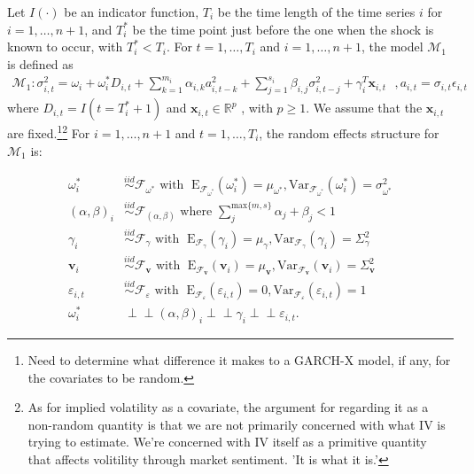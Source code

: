 \documentclass[11pt]{article}
\newcommand{\R}{\mathbb{R}}
\newcommand{\x}{\textbf{x}}
\def\mbf#1{\mathbf{#1}} %
\newcommand{\simiid}{\stackrel{iid}{\sim}} %
\newcommand{\indep}{\perp \!\!\! \perp } %
\def\mrm#1{\mathrm{#1}} %
\def\mc#1{\mathcal{#1}} %
\def\mc#1{\mathcal{#1}}
\theoremstyle{definition}
\begin{document}
Let $I(\cdot)$ be an indicator function, $T_i$ be the time length of the time series $i$ for $i = 1, \ldots, n+1$, and $T_i^*$ be the time point just before the one when the shock is known to occur, with $T_i^* < T_i$.  For $t= 1, \ldots, T_i$ and $i = 1, \ldots, n+1$, the model $\mc{M}_1$ is defined as
\begin{align}
\mc{M}_1 \colon \sigma^{2}_{i,t} = \omega_{i} + \omega^{*}_i D_{i,t}  + \sum^{m_{i}}_{k=1}\alpha_{i,k}a^{2}_{i,t-k} + \sum_{j=1}^{s_{i}}\beta_{i,j}\sigma_{i,t-j}^{2} + \gamma_{i}^{T} 
          \x_{i,t} \text{ }, a_{i,t} = \sigma_{i,t}\epsilon_{i,t} \label{equation1}
\end{align}
 where $D_{i,t} = I(t = T_i^* + 1)$ 
and $\x_{i,t} \in \R^{p}$ , with $p \geq 1$.  We assume that the 
$\mbf{x}_{i,t}$ are fixed.\footnote{Need to determine what difference it makes to a GARCH-X model, if any, for the covariates to be random.}\footnote{As for implied volatility as a covariate, the argument for regarding it as a non-random quantity is that we are not primarily concerned with what IV is trying to estimate.  We're concerned with IV itself as a primitive quantity that affects volitility through market sentiment. 'It is what it is.'}  For $i = 1, \ldots, n+1$ and $t=1, \ldots, T_i$, the random effects structure for $\mc{M}_1$ is:

\begin{align*}
\omega^{*}_i &\simiid \mc{F}_{\omega^{*}} \text{ with }  \; \mrm{E}_{\mc{F}_{\omega^{*}}}(\omega^{*}_i) = \mu_{\omega^{*}}, \mrm{Var}_{\mc{F}_{\omega^{*}}}(\omega^{*}_i)  = \sigma^2_{\omega^{*}}  \\
  (\alpha, \beta)_i &\simiid \mc{F}_{(\alpha, \beta)} \text{ where } \sum^{ \text{max} \{m,s \} }_{j}\alpha_j + \beta_j < 1 \\
   \gamma_i &\simiid \mc{F}_{\gamma} \text{ with }  \; \mrm{E}_{\mc{F}_{\gamma}}(\gamma_i) = \mu_{\gamma}, \mrm{Var}_{\mc{F}_{\gamma}}(\gamma_i)  = \Sigma^2_{\gamma} \\
   \mathbf{v}_i &\simiid \mc{F}_{\mathbf{v}} \text{ with }  \; \mrm{E}_{\mc{F}_{\mathbf{v}}}(\mathbf{v}_i) = \mu_{\mathbf{v}}, \mrm{Var}_{\mc{F}_{\mathbf{v}}}(\mathbf{v}_i)  = \Sigma^2_{\mathbf{v}} \\
\varepsilon_{i,t} & \simiid  \mc{F}_{\varepsilon} \text{ with }  \; \mrm{E}_{\mc{F}_{\varepsilon}}(\varepsilon_{i,t}) = 0, \mrm{Var}_{\mc{F}_{\varepsilon}}(\varepsilon_{i,t})  = 1 \\
\omega^{*}_i &\indep  (\alpha, \beta)_i \indep \gamma_i \indep \varepsilon_{i,t}.
\end{align*}
\end{document}
